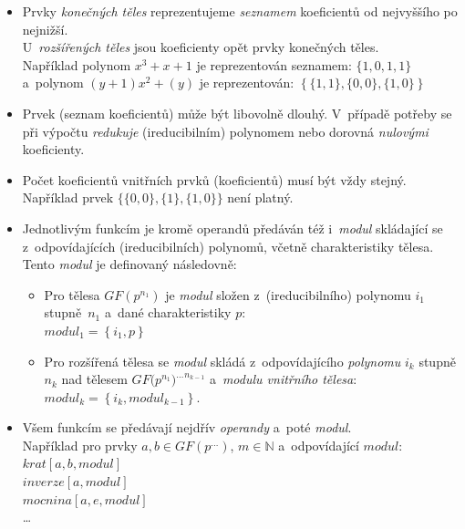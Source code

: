 \documentclass[thesis=M,czech,hidelinks]{FITthesis}[2012/06/26]
\newcommand{\0}{{\textcolor[gray]{0.75}{0}}}
\begin{document}
\begin{itemize}
    \item Prvky \emph{konečných těles} reprezentujeme \emph{seznamem}
        koeficientů od nejvyššího po nejnižší. \\
        U~\emph{rozšířených těles} jsou koeficienty opět prvky konečných těles. \\
        Například polynom $x^3+x+1$ je reprezentován seznamem: $\{1,0,1,1\}$ \\
        a~polynom $(y+1)x^2 + (y)$ je reprezentován:
        $\left\{\{1,1\},\{0,0\},\{1,0\}\right\}$

    \item Prvek (seznam koeficientů) může být libovolně dlouhý. V~případě
        potřeby se při výpočtu \emph{redukuje} (ireducibilním) polynomem nebo
        dorovná \emph{nulovými} koeficienty.

    \item Počet koeficientů vnitřních prvků (koeficientů) musí být vždy stejný. \\
        Například prvek $\{\{0,0\},\{1\},\{1,0\}\}$ není platný.

    \item Jednotlivým funkcím je kromě operandů předáván též i~\emph{modul}
        skládající se z~odpovídajících (ireducibilních) polynomů, včetně
        charakteristiky tělesa. Tento \emph{modul} je definovaný následovně:
        \begin{itemize}
            \item Pro tělesa $GF(p^{n_1})$ je \emph{modul} složen
                z~(ireducibilního) polynomu $i_1$ stupně~$n_1$ a~dané
                charakteristiky $p$:\\
                $modul_1 = \left\{i_1,p\right\}$
            \item Pro rozšířená tělesa se \emph{modul} skládá z~odpovídajícího
                \emph{polynomu} $i_k$ stupně $n_k$ nad tělesem $GF(
                {{p^{n_1}})^{\ldots}}^{n_{k-1}}$ a~\emph{modulu vnitřního
                tělesa}: \\
                $modul_k = \left\{i_k,modul_{k-1}\right\}$.
        \end{itemize}

    \item Všem funkcím se předávají nejdřív \emph{operandy} a~poté
        \emph{modul}.\\
        Například pro prvky $a,b\in GF(p^{\ldots})$, $m\in\mathbb{N}$
        a~odpovídající $modul$: \\
        \hspace*{0.6cm}$krat[a,b,modul]$ \\
        \hspace*{0.6cm}$inverze[a,modul]$ \\
        \hspace*{0.6cm}$mocnina[a,e,modul]$ \\
        \hspace*{0.6cm}\ldots


\end{itemize}
\end{document}
